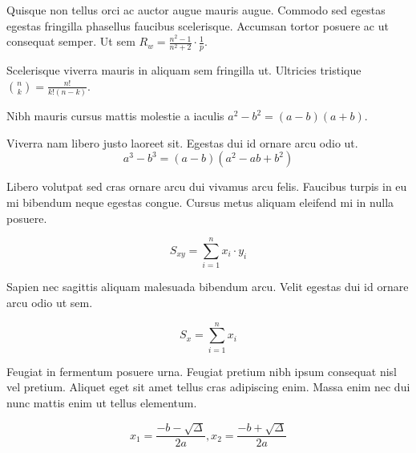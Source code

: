 \documentclass{article}
\begin{document}
Quisque non tellus orci ac auctor augue mauris augue. Commodo sed egestas egestas fringilla phasellus faucibus scelerisque. Accumsan tortor posuere ac ut consequat semper. Ut sem \begin{math}
	R_w=\frac{n^2-1}{n^2+2} \cdot \frac{1}{p}
\end{math}.\newline

Scelerisque viverra mauris in aliquam sem fringilla ut. Ultricies tristique $ {n \choose k}=\frac{n!}{k!(n-k)} $.\newline

Nibh mauris cursus mattis molestie a iaculis \( a^2-b^2=(a-b)(a+b) \).\newline

Viverra nam libero justo laoreet sit. Egestas dui id ornare arcu odio ut.
\[ a^3-b^3=(a-b)(a^2-ab+b^2) \]

Libero volutpat sed cras ornare arcu dui vivamus arcu felis. Faucibus turpis in eu mi bibendum neque egestas congue. Cursus metus aliquam eleifend mi in nulla posuere.

$$ S_{xy}=\sum_{i=1}^{n}x_i\cdot y_i $$

Sapien nec sagittis aliquam malesuada bibendum arcu. Velit egestas dui id ornare arcu odio ut sem. 

\begin{displaymath}
	S_x=\sum_{i=1}^{n}x_i
\end{displaymath}

Feugiat in fermentum posuere urna. Feugiat pretium nibh ipsum consequat nisl vel pretium. Aliquet eget sit amet tellus cras adipiscing enim. Massa enim nec dui nunc mattis enim ut tellus elementum.

\begin{equation}
	x_1=\frac{-b-\sqrt{\Delta}}{2a},x_2=\frac{-b+\sqrt{\Delta}}{2a}
\end{equation}
\end{document}
